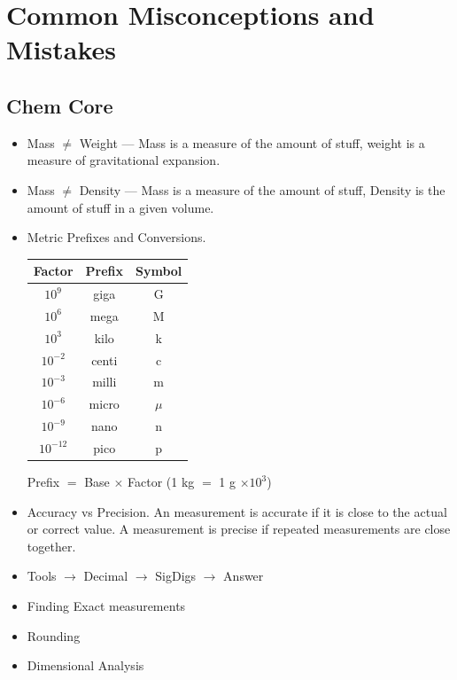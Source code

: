 \section{Common Misconceptions and Mistakes}
    \subsection{Chem Core}
        \begin{itemize}
            \item Mass $\neq$ Weight — Mass is a measure of the amount of stuff, weight is a measure of gravitational expansion.
            \item Mass $\neq$ Density — Mass is a measure of the amount of stuff, Density is the amount of stuff in a given volume.
            \item Metric Prefixes and Conversions.
            \begin{center}
                \begin{tabular}{| c | c | c |}
                    \hline
                    Factor & Prefix & Symbol \\
                    \hline
                    $10^9$ & giga & G \\
                    $10^6$ & mega & M \\
                    $10^3$ & kilo & k \\
                    $10^{-2}$ & centi & c \\
                    $10^{-3}$ & milli & m\\
                    $10^{-6}$ & micro & $\mu$ \\
                    $10^{-9}$ & nano & n \\
                    $10^{-12}$ & pico & p\\
                    \hline
                \end{tabular}
            \end{center}
            Prefix $=$ Base $\times$ Factor (1 kg $=$ 1 g $\times 10^3$)
            \item Accuracy vs Precision. An measurement is accurate if it is close to the actual or correct value. A measurement is precise if repeated measurements are close together.
            \item Tools $\rightarrow$ Decimal $\rightarrow$ SigDigs $\rightarrow$ Answer
            \item Finding Exact measurements
            \item Rounding
            \item Dimensional Analysis

\end{itemize}
